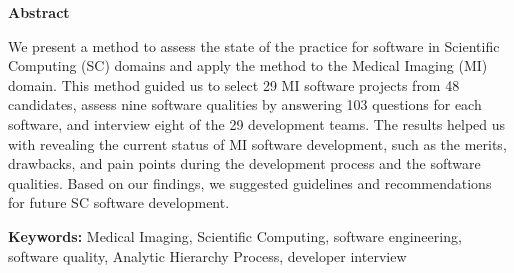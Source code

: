 \begin{center}
\textbf{\large Abstract}
\end{center}

We present a method to assess the state of the practice for software in Scientific Computing (SC) domains and apply the method to the Medical Imaging (MI) domain. This method guided us to select 29 MI software projects from 48 candidates, assess nine software qualities by answering 103 questions for each software, and interview eight of the 29 development teams. The results helped us with revealing the current status of MI software development, such as the merits, drawbacks, and pain points during the development process and the software qualities. Based on our findings, we suggested guidelines and recommendations for future SC software development. \newline

\noindent\textbf{Keywords:} Medical Imaging, Scientific Computing, software engineering, software quality, Analytic Hierarchy Process, developer interview
